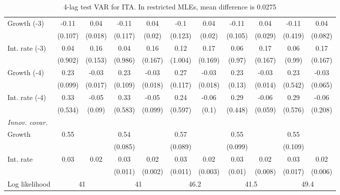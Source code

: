 \begin{table}[htbp]
\begin{tabular}{@{\extracolsep{4pt}}lcccccccccc@{}}
\quad Growth (-3) 	 &-0.11 	 & 0.04 	 & -0.11 	 & 0.04 	 & -0.1 	 & 0.04 	 & -0.11 	 & 0.04 	 & -0.11 	 & 0.04	 \\ 
 		 & (0.107) 	 & (0.018) 	 & (0.117) 	 & (0.02) 	 & (0.123) 	 & (0.02) 	 & (0.105) 	 & (0.029) 	 & (0.419) 	 & (0.082) 	 \\ 
\quad Int. rate (-3) 	 &0.04 	 & 0.16 	 & 0.04 	 & 0.16 	 & 0.12 	 & 0.17 	 & 0.06 	 & 0.17 	 & 0.06 	 & 0.17	 \\ 
 		 & (0.902) 	 & (0.153) 	 & (0.986) 	 & (0.167) 	 & (1.004) 	 & (0.169) 	 & (0.97) 	 & (0.167) 	 & (0.99) 	 & (0.167) 	 \\ 
\quad Growth (-4) 	 &0.23 	 & -0.03 	 & 0.23 	 & -0.03 	 & 0.27 	 & -0.03 	 & 0.23 	 & -0.03 	 & 0.23 	 & -0.03	 \\ 
 		 & (0.099) 	 & (0.017) 	 & (0.109) 	 & (0.018) 	 & (0.117) 	 & (0.018) 	 & (0.13) 	 & (0.014) 	 & (0.542) 	 & (0.065) 	 \\ 
\quad Int. rate (-4) 	 &0.33 	 & -0.05 	 & 0.33 	 & -0.05 	 & 0.24 	 & -0.06 	 & 0.29 	 & -0.06 	 & 0.29 	 & -0.06	 \\ 
 		 & (0.534) 	 & (0.09) 	 & (0.583) 	 & (0.099) 	 & (0.597) 	 & (0.1) 	 & (0.448) 	 & (0.059) 	 & (0.576) 	 & (0.208) 	 \\ 
\rule{0pt}{4ex} \emph{Innov. covar.}  	 & 	 & 	 & 	 & 	 & 	 & 	 & 	 & 	 & 	 &\\ 
\quad Growth 	 &0.55 	 &  	 & 0.54 	 &  	 & 0.57 	 &  	 & 0.55 	 &  	 & 0.55 	 & 	 \\ 
 		 &  	 &  	 & (0.085) 	 &  	 & (0.089) 	 &  	 & (0.099) 	 &  	 & (0.109) 	 &  	 \\ 
\quad Int. rate 	 &0.03 	 & 0.02 	 & 0.03 	 & 0.02 	 & 0.03 	 & 0.02 	 & 0.03 	 & 0.02 	 & 0.03 	 & 0.02	 \\ 
 		 &  	 &  	 & (0.011) 	 & (0.002) 	 & (0.011) 	 & (0.003) 	 & (0.01) 	 & (0.008) 	 & (0.017) 	 & (0.006) 	 \\ 
 \hline \rule{0pt}{4ex} 
  Log likelihood 	 &\multicolumn{2}{c}{41} 	 & \multicolumn{2}{c}{41} 	 & \multicolumn{2}{c}{46.2} 	 & \multicolumn{2}{c}{41.5} 	 & \multicolumn{2}{c}{49.4}\\ 

 \hline 	\end{tabular}		\caption{4-lag test VAR for ITA. In restricted MLEs, mean difference is 0.0275}
		\label{tab:ITA4lag}

\end{table}